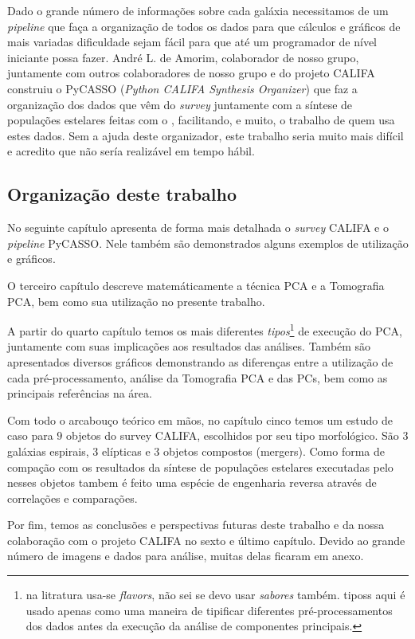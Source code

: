 Dado o grande número de informações sobre cada galáxia necessitamos de um {\em
pipeline} que faça a organização de todos os dados para que cálculos e gráficos
de mais variadas dificuldade sejam fácil para que até um programador de nível
iniciante possa fazer. André L. de Amorim, colaborador de nosso grupo,
juntamente com outros colaboradores de nosso grupo e do projeto CALIFA construiu
o PyCASSO ({\em Python CALIFA \starlight Synthesis Organizer})
\citep[][ cap. 4]{CidFernandes2013I} que faz a organização dos dados que vêm
do {\em survey} juntamente com a síntese de populações estelares feitas com o
\starlight, facilitando, e muito, o trabalho de quem usa estes dados. Sem a
ajuda deste organizador, este trabalho seria muito mais difícil e acredito que
não sería realizável em tempo hábil.

\subsection{Organização deste trabalho}

No seguinte capítulo apresenta de forma mais detalhada o {\em survey} CALIFA e o
{\em pipeline} PyCASSO. Nele também são demonstrados alguns exemplos de
utilização e gráficos.

O terceiro capítulo descreve matemáticamente a técnica PCA e a Tomografia PCA,
bem como sua utilização no presente trabalho. 

A partir do quarto capítulo temos os mais diferentes {\em tipos}\footnote{\ojo
na litratura usa-se {\em flavors}, não sei se devo usar {\em sabores} também.
tiposs aqui é usado apenas como uma maneira de tipificar diferentes
pré-processamentos dos dados antes da execução da análise de componentes
principais.} de execução do PCA, juntamente com suas implicações aos resultados
das análises. Também são apresentados diversos gráficos demonstrando as
diferenças entre a utilização de cada pré-processamento, análise da
Tomografia PCA e das PCs, bem como as principais referências na área.

Com todo o arcabouço teórico em mãos, no capítulo cinco temos um estudo de caso
para $9$ objetos do survey CALIFA, escolhidos por seu tipo morfológico. São $3$
galáxias espirais, $3$ elípticas e $3$ objetos compostos (mergers). Como forma
de compação com os resultados da síntese de populações estelares executadas pelo
\starlight nesses objetos tambem é feito uma espécie de engenharia reversa
através de correlações e comparações.

Por fim, temos as conclusões e perspectivas futuras deste trabalho e da nossa
colaboração com o projeto CALIFA no sexto e último capítulo. \ojo Devido ao
grande número de imagens e dados para análise, muitas delas ficaram em anexo.

